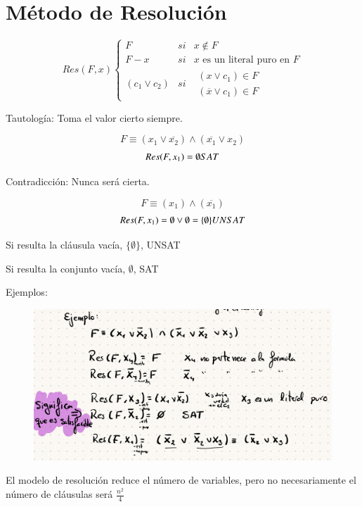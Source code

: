 \documentclass[12pt, twoside, openright]{report} %
\begin{document}
\section{Método de Resolución}
\vspace{-0.5cm}
    $$Res(F,x)\left\{\begin{matrix}  
		F &si&x\notin F \\  
		F-x &si& x \text{ es un literal puro en } F \\  
		(c_1 \vee c_2) &si& \begin{matrix}  (x \vee c_1) \in F\\  
		(\overline{x} \vee c_1) \in F  \end{matrix}  \end{matrix}\right.$$

	Tautología: Toma el valor cierto siempre.
	\vspace{-0.5cm}

    
	$$F \equiv (x_1 \vee \overline{x_2})\wedge (\overline{x_1} \vee x_2)$$
	$$Res(F,x_1)= \emptyset \space SAT$$

	Contradicción: Nunca será cierta.
	\vspace{-0.5cm}

	$$F \equiv (x_1)\wedge (\overline{x_1})$$
	$$Res(F,x_1)= \emptyset \vee \emptyset = \{ \emptyset \} \space UNSAT$$

	  
	Si resulta la cláusula vacía, \(\{ \emptyset \}\), UNSAT

	
  Si resulta la conjunto vacía, \(\emptyset\), SAT

  
  
    Ejemplos:
	\begin{figure}[H]
		{\includegraphics[scale=.2]{Untitled 29.png}}
	\end{figure}
	El modelo de resolución reduce el número de variables, pero no
    necesariamente el número de cláusulas será \(\frac {n^2} {4}\)
\end{document}
